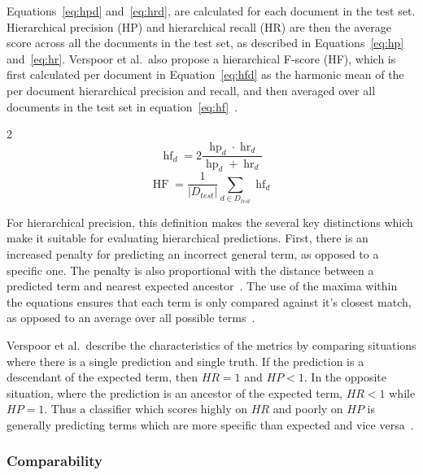 \documentclass[11pt]{article}
\theoremstyle{plain}
\theoremstyle{definition}
\begin{document}
Equations~\ref{eq:hpd} and~\ref{eq:hrd}, are calculated for each document in the test set. Hierarchical precision (HP) and hierarchical recall (HR) are then the average score across all the documents in the test set, as described in Equations~\ref{eq:hp} and~\ref{eq:hr}. Verspoor et al.\ also propose a hierarchical F-score (HF), which is first calculated per document in Equation~\ref{eq:hfd}  as the harmonic mean of the per document hierarchical precision and recall, and then averaged over all documents in the test set in equation~\ref{eq:hf}~\cite{verspoor/2006/categorization}.

\begin{multicols}{2}
    \begin{equation}\label{eq:hfd}
        \operatorname{hf}_d = 2 \frac{\operatorname{hp}_d \cdot \operatorname{hr}_d}{\operatorname{hp}_d + \operatorname{hr}_d}
    \end{equation}
    \break{}
    \begin{equation}\label{eq:hf}
        \operatorname{HF} = \frac{1}{|D_{test}|} \sum_{d \in D_{test}} \operatorname{hf}_d
    \end{equation}
\end{multicols}

For hierarchical precision, this definition makes the several key distinctions which make it suitable for evaluating hierarchical predictions. First, there is an increased penalty for predicting an incorrect general term, as opposed to a specific one. The penalty is also proportional with the distance between a predicted term and nearest expected ancestor~\cite{verspoor/2006/categorization}. The use of the maxima within the equations ensures that each term is only compared against it's closest match, as opposed to an average over all possible terms~\cite{verspoor/2006/categorization}.

Verspoor et al.\ describe the characteristics of the metrics by comparing situations where there is a single prediction and single truth. If the prediction is a descendant of the expected term, then $HR=1$ and $HP<1$. In the opposite situation, where the prediction is an ancestor of the expected term, $HR < 1$ while $HP=1$. Thus a classifier which scores highly on $HR$ and poorly on $HP$ is generally predicting terms which are more specific than expected and vice versa~\cite{verspoor/2006/categorization}.

\subsubsection{Comparability}\label{sec:methods-metrics-comparability}
\end{document}
